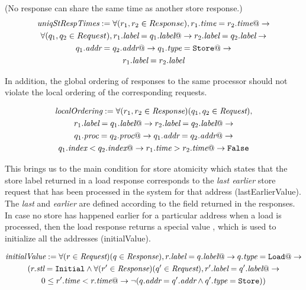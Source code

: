 \begin{defn} (No response can share the same time as another store response.)
\begin{multline*}
\textit{uniqStRespTimes} := 
\forall (r_1, r_2 \in Response), r_1.\textit{time} = r_2.\textit{time} @-> \\
\forall (q_1, q_2 \in Request), r_1.\textit{label} = q_1.\textit{label} @->
r_2.\textit{label} = q_2.\textit{label} -> \\
q_1.\textit{addr} = q_2.\textit{addr} @-> q_1.\textit{type} = \texttt{Store} @-> \\ r_1.\textit{label} = r_2.\textit{label}
\end{multline*}
\end{defn}

In addition, the global ordering of responses to the same processor should not
violate the local ordering of the corresponding requests.
\begin{defn}
\begin{multline*}
\textit{localOrdering} :=
\forall (r_1, r_2 \in \textit{Response}) (q_1, q_2 \in \textit{Request}), \\ r_1.\textit{label}
= q_1.\textit{label} @-> r_2.\textit{label} = q_2.\textit{label} @-> \\ q_1.\textit{proc} = q_2.\textit{proc} @->
q_1.\textit{addr} = q_2.\textit{addr} @-> \\ q_1.\textit{index} < q_2.\textit{index} @-> r_1.\textit{time} > r_2.\textit{time}
  @-> \texttt{False}
\end{multline*}
\end{defn}

This brings us to the main condition for store atomicity which states that the
store label returned in a load response corresponds to the \emph{last earlier}
store request that has been processed in the system for that address (lastEarlierValue). The
\emph{last} and \emph{earlier} are defined according to the field \mytime{}
returned in the responses. In case no store has happened earlier for a
particular address when a load is processed, then the load response returns a
special value \Initial, which is used to initialize all the addresses (initialValue).

\begin{defn}
\begin{multline*}
\textit{initialValue}:= \forall (r \in \textit{Request}) (q \in \textit{Response}), r.\textit{label} = q.\textit{label} @->
q.\textit{type} = \texttt{Load} @-> \\(r.\textit{stl} = \texttt{Initial} \wedge
\forall (r' \in \textit{Response}) (q' \in \textit{Request}),
r'.\textit{label} = q'.\textit{label} @-> \\ 0 \le r'.\textit{time} < r.\textit{time} @->
\neg (q.\textit{addr} = q'.\textit{addr} \wedge q'.\textit{type} = \texttt{Store}))
\end{multline*}
\end{defn}

